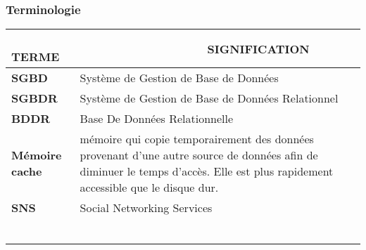 \newpage

\def\termea{\bf \footnotesize SGBD}
\def\sensa{\footnotesize Système de Gestion de Base de Données}

\def\termeb{\bf \footnotesize SGBDR}
\def\sensb{\footnotesize Système de Gestion de Base de Données Relationnel}

\def\termec{\bf \footnotesize BDD}
\def\sensc{\footnotesize Base De Données}

\def\termec{\bf \footnotesize BDDR}
\def\sensc{\footnotesize Base De Données Relationnelle}

\def\termed{\bf \footnotesize Mémoire cache}
\def\sensd{\footnotesize mémoire qui copie temporairement des données provenant d'une autre source de données afin de diminuer le temps d'accès. Elle est plus rapidement accessible que le disque dur.}

\def\termee{\bf \footnotesize SNS}
\def\sense{\footnotesize Social Networking Services}

\def\termef{\bf \footnotesize }
\def\sensf{\footnotesize }

\def\termeg{\bf \footnotesize }
\def\sensg{\footnotesize }

\def\termeh{\bf \footnotesize }
\def\sensh{\footnotesize }

\def\termei{\bf \footnotesize }
\def\sensi{\footnotesize }

\def\termej{\bf \footnotesize }
\def\sensj{\footnotesize }

\def\termek{\bf \footnotesize }
\def\sensk{\footnotesize }



\begin{center}
\subsubsection*{Terminologie}
\begin{tabular}{p{5cm}p{12cm}}
\hline
{\bf ~~~~~ T{\scriptsize ERME}} & {\bf ~~~~~~~~~~~~~~~~~~~
S{\scriptsize IGNIFICATION}}\\
\hline
\termea &\sensa\\
\termeb &\sensb\\
\termec  &\sensc\\
\termed  &\sensd\\
\termee  &\sense\\
\hline
\termef & \sensf\\
\termeg & \sensg\\
\termeh & \sensh\\
\termei & \sensi\\
\termej & \sensj\\
\termek & \sensk\\

\end{tabular}
 
\end{center}

